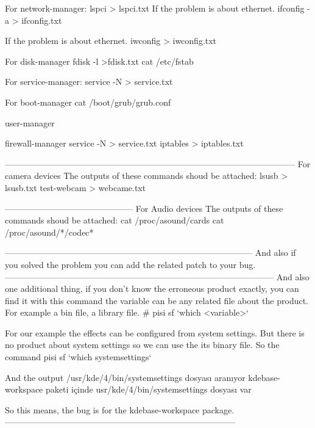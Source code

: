 \documentclass[a4paper,10pt]{article}
\begin{document}
 For network-manager:
  lspci > lspci.txt
  If the problem is about ethernet.
    ifconfig -a > ifconfig.txt

  If the problem is about ethernet.
    iwconfig > iwconfig.txt
  
  For disk-manager
    fdisk -l >fdisk.txt
    cat /etc/fstab

  For service-manager:
   service -N > service.txt

  For boot-manager
  cat /boot/grub/grub.conf
  
  user-manager

  firewall-manager
    service -N > service.txt
    iptables > iptables.txt

------------------------------------------------------------------------------------------------------
For camera devices
The outputs of these commands shoud be attached:
  lsusb > lsusb.txt
  test-webcam > webcame.txt

---------------------------------------------
For Audio devices
The outputs of these commands shoud be attached:
  cat /proc/asound/cards
  cat /proc/asound/*/codec*

---------------------------------------------------------------------------------------
And also if you solved the problem you can add the related patch to your bug.
-----------------------------------------------------------------------------------------------
And also one additional thing, if you don't know the erroneous product exactly, you can find it with this command
the variable can be any related file about the product. For example a bin file, a library file. 
# pisi sf `which <variable>`

For our example the effects can be configured from system settings. But there is no product about system settings so we can use the its binary file.
So the command 
pisi sf `which systemsettings`

And the output
/usr/kde/4/bin/systemsettings dosyası aranıyor
kdebase-workspace paketi içinde usr/kde/4/bin/systemsettings dosyası var

So this means, the bug is for the kdebase-workspace package.
---------------------------------------------------------------------------------
\end{document}
